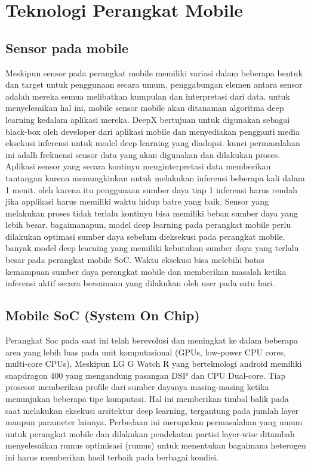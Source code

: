 \section{Teknologi Perangkat Mobile}
\subsection{Sensor pada mobile}
Meskipun sensor pada perangkat mobile memiliki variasi dalam beberapa bentuk dan target untuk penggunaan secara umum, penggabungan elemen antara sensor adalah mereka semua melibatkan kumpulan dan interpretasi dari data. untuk menyelesaikan hal ini, mobile sensor mobile akan ditanaman algoritma deep learning kedalam aplikasi mereka. DeepX bertujuan untuk digunakan sebagai black-box oleh developer dari aplikasi mobile dan menyediakan pengganti media eksekusi inferensi untuk model deep learning yang diadopsi. kunci permasalahan ini adalh frekuensi sensor data yang akan digunakan dan dilakukan proses. Aplikasi sensor yang secara kontinyu menginterpretasi data memberikan tantangan karena memungkinkan untuk melakukan inferensi beberapa kali dalam 1 menit. oleh karena itu penggunaan sumber daya tiap 1 inferensi harus rendah jika applikasi harus memiliki waktu hidup batre yang baik. Sensor yang melakukan proses tidak terlalu kontinyu bisa memiliki beban sumber daya yang lebih besar. bagaimanapun, model deep learning pada perangkat mobile perlu dilakukan optimasi sumber daya sebelum dieksekusi pada perangkat mobile. banyak model deep learning yang memiliki kebutuhan sumber daya yang terlalu besar pada perangkat mobile SoC. Waktu eksekusi bisa melebihi batas kemampuan sumber daya perangkat mobile dan memberikan masalah ketika inferensi aktif secara bersamaan yang dilakukan oleh user pada satu hari.

\subsection{Mobile SoC (System On Chip)}
Perangkat Soc pada saat ini telah berevolusi dan meningkat ke dalam beberapa area yang lebih luas pada unit komputasional (GPUs, low-power CPU cores, multi-core CPUs). Meskipun LG G Watch R yang berteknologi android memiliki snapdragon 400 yang mengandung pasangan DSP dan CPU Dual-core. Tiap prosesor memberikan profile dari sumber dayanya masing-masing ketika menunjukan beberapa tipe komputasi. Hal ini memberikan timbal balik pada saat melakukan eksekusi arsitektur deep learning, tergantung pada jumlah layer maupun parameter lainnya. Perbedaan ini merupakan permasalahan yang umum untuk perangkat mobile dan dilakukan pendekatan partisi layer-wise ditambah menyelesaikan rumus optimisasi (rumus) untuk menentukan bagaimana heterogen ini harus memberikan hasil terbaik pada berbagai kondisi.

